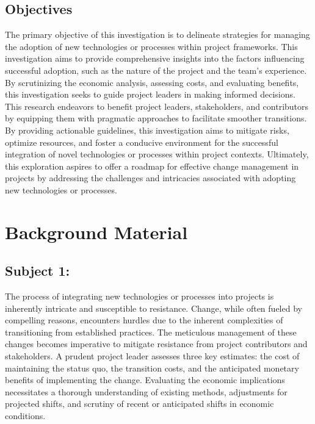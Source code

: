 \documentclass[11pt,letterpaper]{report}
\begin{document}
\section{Objectives}
The primary objective of this investigation is to delineate strategies for managing the adoption of new technologies or processes within project frameworks. This investigation aims to provide comprehensive insights into the factors influencing successful adoption, such as the nature of the project and the team's experience. By scrutinizing the economic analysis, assessing costs, and evaluating benefits, this investigation seeks to guide project leaders in making informed decisions. 
 This research endeavors to benefit project leaders, stakeholders, and contributors by equipping them with pragmatic approaches to facilitate smoother transitions. By providing actionable guidelines, this investigation aims to mitigate risks, optimize resources, and foster a conducive environment for the successful integration of novel technologies or processes within project contexts. Ultimately, this exploration aspires to offer a roadmap for effective change management in projects by addressing the challenges and intricacies associated with adopting new technologies or processes.


\chapter{Background Material}
\section{Subject 1:} 
\item {} 
The process of integrating new technologies or processes into projects is inherently intricate and susceptible to resistance. Change, while often fueled by compelling reasons, encounters hurdles due to the inherent complexities of transitioning from established practices. The meticulous management of these changes becomes imperative to mitigate resistance from project contributors and stakeholders. A prudent project leader assesses three key estimates: the cost of maintaining the status quo, the transition costs, and the anticipated monetary benefits of implementing the change. Evaluating the economic implications necessitates a thorough understanding of existing methods, adjustments for projected shifts, and scrutiny of recent or anticipated shifts in economic conditions.
\end{document}
